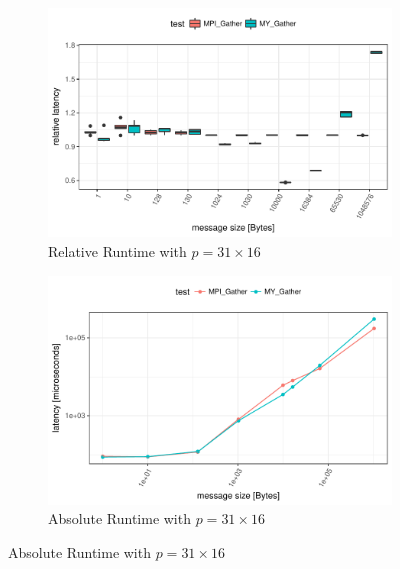 \begin{figure}[H]
    \centering
    
    \begin{subfigure}[b]{0.49\textwidth}
        \includegraphics[width=\textwidth]{../benchmarks/openmpi/binom/gather_31/rel_runtime.pdf}
        \caption{Relative Runtime with $p=31 \times 16$}
        \label{fig:Gather:OpenMPI:Rel:31}
    \end{subfigure}
    \begin{subfigure}[b]{0.49\textwidth}
        \includegraphics[width=\textwidth]{../benchmarks/openmpi/binom/gather_31/runtime.pdf}
        \caption{Absolute Runtime with $p=31 \times 16$}
        \label{fig:Gather:OpenMPI:Abs:31}
    \end{subfigure}
    

\end{figure}

